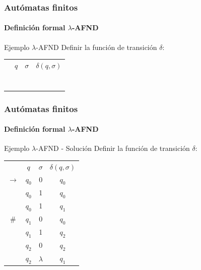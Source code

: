 \documentclass{beamer}
\begin{document}
        \begin{frame}
			\frametitle{Aut\'omatas finitos}
			\framesubtitle{Definici\'on formal $\lambda$-AFND}

            \begin{exampleblock}{Ejemplo $\lambda$-AFND}
               Definir la funci\'on de transici\'on $\delta$:
               
               \begin{center}
                   \begin{tabular}{c|ccc|} 
                   \cline{2-4}
                       & $q$ & $\sigma$ & $\delta(q,\sigma)$ \\ 
                   \cline{2-4}
                       & & & \\
                       & & & \\
                       & & & \\
                       & & & \\
                       & & & \\
                       & & & \\
                       & & & \\
                   \cline{2-4}
                   \end{tabular}
               \end{center}
            \end{exampleblock}
		\end{frame}

        \begin{frame}
			\frametitle{Aut\'omatas finitos}
			\framesubtitle{Definici\'on formal $\lambda$-AFND}

            \begin{exampleblock}{Ejemplo $\lambda$-AFND - Soluci\'on}
               Definir la funci\'on de transici\'on $\delta$:
               
               \begin{center}
                   \begin{tabular}{c|ccc|} 
                   \cline{2-4}
                       & $q$ & $\sigma$ & $\delta(q,\sigma)$ \\ 
                   \cline{2-4}
                       $\rightarrow$
                       & $q_{0}$ & 0 & $q_{0}$ \\
                       & $q_{0}$ & 1 & $q_{0}$ \\
                       & $q_{0}$ & 1 & $q_{1}$ \\
                       \# 
                       & $q_{1}$ & 0 & $q_{0}$ \\
                       & $q_{1}$ & 1 & $q_{2}$ \\
                       & $q_{2}$ & 0 & $q_{2}$ \\
                       & $q_{2}$ & $\lambda$ & $q_{1}$ \\
                   \cline{2-4}
                   \end{tabular}
               \end{center}
            \end{exampleblock}
		\end{frame}
\end{document}
